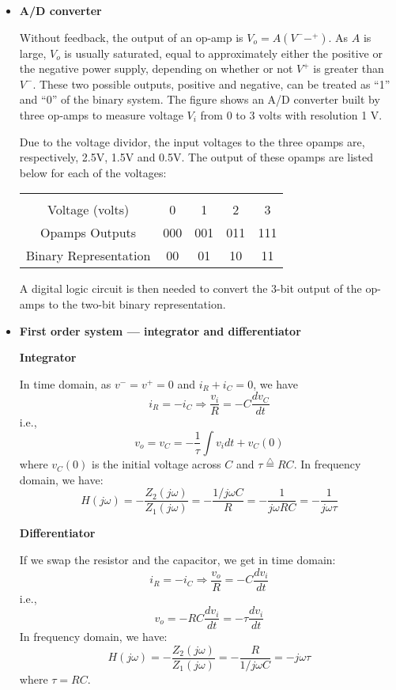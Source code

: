 \begin{itemize}
\item {\bf A/D converter}

Without feedback, the output of an op-amp is $V_o=A(V^--^+)$. As $A$ is
large, $V_o$ is usually saturated, equal to approximately either the 
positive or the negative power supply, depending on whether or not $V^+$ 
is greater than $V^-$. These two possible outputs, positive and negative,
can be treated as ``1'' and ``0'' of the binary system. The figure shows
an A/D converter built by three op-amps to measure voltage $V_i$ from 0 to 
3 volts with resolution 1 V.


Due to the voltage dividor, the input voltages to the three opamps are, 
respectively, 2.5V, 1.5V and 0.5V. The output of these opamps are listed
below for each of the voltages:

\begin{tabular}{c|cccc}\hline \\
Voltage (volts) & 0 	& 1	& 2	& 3	\\
Opamps Outputs	& 000	& 001	& 011	& 111	\\
Binary Representation	& 00	& 01	& 10	& 11	\\ \hline
\end{tabular}
A digital logic circuit is then needed to convert the 3-bit output
of the op-amps to the two-bit binary representation.

\item {\bf First order system --- integrator and differentiator}


{\bf Integrator}

In time domain, as $v^-=v^+=0$ and $i_R+i_C=0$, we have
\[ i_R=-i_C \Longrightarrow \frac{v_i}{R}=-C\frac{d v_C}{dt} \]
i.e.,
\[ v_o=v_C=-\frac{1}{\tau} \int v_i dt+v_C(0)	\]
where $v_C(0)$ is the initial voltage across $C$ and 
$\tau \stackrel{\triangle}{=}RC$. In frequency domain, we have:
\[ H(j\omega)=-\frac{Z_2(j\omega)}{Z_1(j\omega)}=-\frac{1/j\omega C}{R}
=-\frac{1}{j\omega RC}=-\frac{1}{j\omega \tau}	\]

{\bf Differentiator}

If we swap the resistor and the capacitor, we get in time domain:
\[ i_R=-i_C \Longrightarrow \frac{v_o}{R}=-C\frac{d v_i}{dt} \]
i.e.,
\[ v_o=-RC \frac{d v_i}{dt}=-\tau \frac{d v_i}{dt}	\]
In frequency domain, we have:
\[ H(j\omega)=-\frac{Z_2(j\omega)}{Z_1(j\omega)}=-\frac{R}{1/j\omega C}
  =-j\omega \tau \]
where $\tau=RC$. 


\end{itemize}
